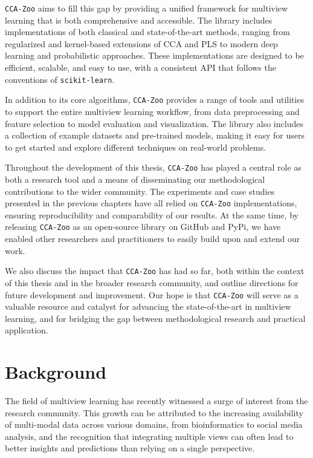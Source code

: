 \texttt{CCA-Zoo} aims to fill this gap by providing a unified framework for multiview learning that is both comprehensive and accessible. The library includes implementations of both classical and state-of-the-art methods, ranging from regularized and kernel-based extensions of CCA and PLS to modern deep learning and probabilistic approaches. These implementations are designed to be efficient, scalable, and easy to use, with a consistent API that follows the conventions of \texttt{scikit-learn}.

In addition to its core algorithms, \texttt{CCA-Zoo} provides a range of tools and utilities to support the entire multiview learning workflow, from data preprocessing and feature selection to model evaluation and visualization. The library also includes a collection of example datasets and pre-trained models, making it easy for users to get started and explore different techniques on real-world problems.

Throughout the development of this thesis, \texttt{CCA-Zoo} has played a central role as both a research tool and a means of disseminating our methodological contributions to the wider community. The experiments and case studies presented in the previous chapters have all relied on \texttt{CCA-Zoo} implementations, ensuring reproducibility and comparability of our results. At the same time, by releasing \texttt{CCA-Zoo} as an open-source library on GitHub and PyPi, we have enabled other researchers and practitioners to easily build upon and extend our work.

We also discuss the impact that \texttt{CCA-Zoo} has had so far, both within the context of this thesis and in the broader research community, and outline directions for future development and improvement. Our hope is that \texttt{CCA-Zoo} will serve as a valuable resource and catalyst for advancing the state-of-the-art in multiview learning, and for bridging the gap between methodological research and practical application.

\section{Background}

The field of multiview learning has recently witnessed a surge of interest from the research community. This growth can be attributed to the increasing availability of multi-modal data across various domains, from bioinformatics to social media analysis, and the recognition that integrating multiple views can often lead to better insights and predictions than relying on a single perspective.

